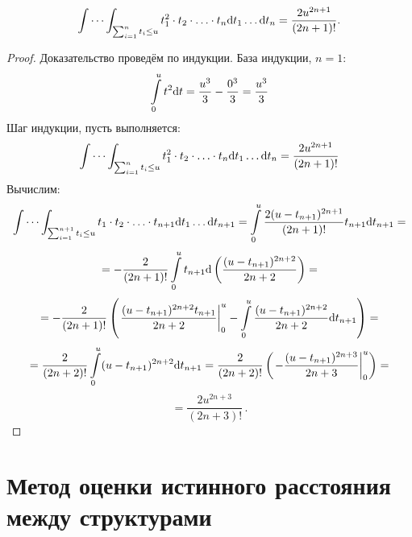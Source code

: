 \begin{lemma}
$$
    \idotsint_{ \sum_{i=1}^{n} t_i \leq u} {
        t_1^2 \cdot t_2 \cdot \ldots \cdot t_{n}
        \mathrm{d} t_1 \ldots \mathrm{d} t_{n}
    } =
    \frac {2 u ^ {2n + 1}} {(2n + 1)!}
    \label{subint2}.
$$
\end{lemma}
\begin{proof}
Доказательство проведём по индукции. База индукции, $n = 1$:
$$
    \intop_0^u {t^2 \mathrm{d} t} =
    \frac {u ^ 3} 3 - \frac {0 ^ 3} 3 =
    \frac {u ^ 3} 3
$$
Шаг индукции, пусть выполняется:
$$
    \idotsint_{ \sum_{i=1}^{n} t_i \leq u} {
        t_1^2 \cdot t_2 \cdot \ldots \cdot t_{n}
        \mathrm{d} t_1 \ldots \mathrm{d} t_{n}
    } =
    \frac {2 u ^ {2n + 1}} {(2n + 1)!}
$$
Вычислим:
$$
    \idotsint_{ \sum_{i=1}^{n+1} t_i \leq u} {
        t_1 \cdot t_2 \cdot \ldots \cdot t_{n+1}
        \mathrm{d} t_1 \ldots \mathrm{d} t_{n+1}
    } =
    \intop_{0}^{u}
    \frac {2 (u - t_{n+1})^{2n + 1}} {(2n + 1)!} t_{n+1}
    \mathrm{d} t_{n+1}
    =
$$ $$
    = - \frac 2 {(2n + 1)!}
    \intop_{0}^{u}
    t_{n+1} \mathrm{d} \left(
        \frac {(u - t_{n+1})^{2n + 2}} {2n + 2}
    \right)
    =
$$ $$
    =
    - \frac 2 {(2n + 1)!}
    \left( \left.
        \frac {(u - t_{n+1})^{2n + 2} t_{n+1}} {2n + 2} \right|_0^u
        - \intop_{0}^{u}
        \frac {(u - t_{n+1}) ^ {2n+2}} {2n+2}
        \mathrm{d} t_{n+1}
    \right)
    = $$ $$ =
    \frac 2 {(2n + 2)!}
    \intop_{0}^{u}
    (u - t_{n+1}) ^ {2n+2}
    \mathrm{d} t_{n+1}
    =
    \frac 2 {(2n + 2)!}
    \left( \left.
        - \frac
        {(u - t_{n+1}) ^ {2n+3}}
        {2n + 3}
        \right|_0^u
    \right)
    = $$ $$ =
    \frac {2 u ^ {2n+3}} {(2n + 3)!} \, .%
$$
\end{proof}

\section{Метод оценки истинного расстояния между структурами}

